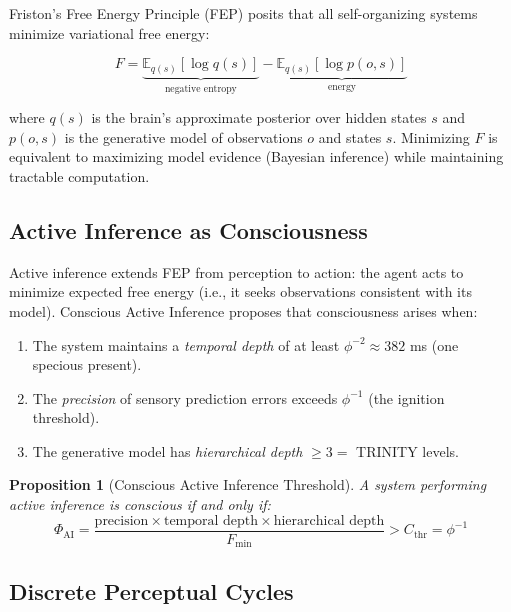\documentclass[12pt,a4paper]{article}
\newtheorem{proposition}[theorem]{Proposition}
\begin{document}
Friston's Free Energy Principle (FEP) \cite{Friston2010} posits that all
self-organizing systems minimize variational free energy:

\begin{equation}
F = \underbrace{\mathbb{E}_{q(s)}[\log q(s)]}_{\text{negative entropy}}
  - \underbrace{\mathbb{E}_{q(s)}[\log p(o, s)]}_{\text{energy}}
\label{eq:fep}
\end{equation}

\noindent
where $q(s)$ is the brain's approximate posterior over hidden states $s$ and
$p(o, s)$ is the generative model of observations $o$ and states $s$.
Minimizing $F$ is equivalent to maximizing model evidence (Bayesian inference)
while maintaining tractable computation.

\subsection{Active Inference as Consciousness}

Active inference extends FEP from perception to action: the agent acts to
minimize expected free energy (i.e., it seeks observations consistent with its
model). Conscious Active Inference \cite{CAI2025} proposes that consciousness
arises when:

\begin{enumerate}[leftmargin=2em]
  \item The system maintains a \emph{temporal depth} of at least $\phi^{-2}
    \approx 382$ ms (one specious present).
  \item The \emph{precision} of sensory prediction errors exceeds $\phi^{-1}$
    (the ignition threshold).
  \item The generative model has \emph{hierarchical depth} $\geq 3 = $ TRINITY
    levels.
\end{enumerate}

\begin{proposition}[Conscious Active Inference Threshold]
A system performing active inference is conscious if and only if:
\begin{equation}
\Phi_{\mathrm{AI}} = \frac{\text{precision} \times \text{temporal depth}
\times \text{hierarchical depth}}{F_{\min}} > C_{\mathrm{thr}} = \phi^{-1}
\end{equation}
\end{proposition}

\subsection{Discrete Perceptual Cycles}
\end{document}
